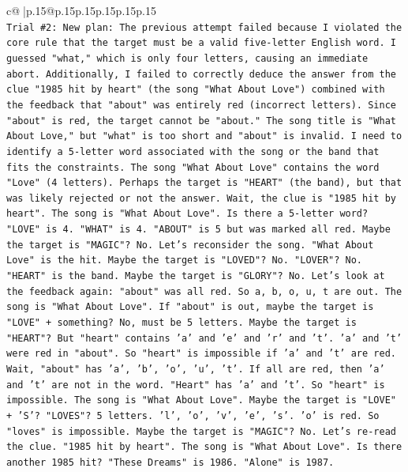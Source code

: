 \documentclass{article}
\begin{document}
{\begin{supertabular}{c@{$\;$}|p{.15\linewidth}@{}p{.15\linewidth}p{.15\linewidth}p{.15\linewidth}p{.15\linewidth}p{.15\linewidth}}
{{{\\ 
\texttt{Trial \#2: New plan: The previous attempt failed because I violated the core rule that the target must be a valid five{-}letter English word. I guessed "what," which is only four letters, causing an immediate abort. Additionally, I failed to correctly deduce the answer from the clue "1985 hit by heart" (the song "What About Love") combined with the feedback that "about" was entirely red (incorrect letters). Since "about" is red, the target cannot be "about." The song title is "What About Love," but "what" is too short and "about" is invalid. I need to identify a 5{-}letter word associated with the song or the band that fits the constraints. The song "What About Love" contains the word "Love" (4 letters). Perhaps the target is "HEART" (the band), but that was likely rejected or not the answer. Wait, the clue is "1985 hit by heart". The song is "What About Love". Is there a 5{-}letter word? "LOVE" is 4. "WHAT" is 4. "ABOUT" is 5 but was marked all red. Maybe the target is "MAGIC"? No. Let's reconsider the song. "What About Love" is the hit. Maybe the target is "LOVED"? No. "LOVER"? No. "HEART" is the band. Maybe the target is "GLORY"? No. Let's look at the feedback again: "about" was all red. So a, b, o, u, t are out. The song is "What About Love". If "about" is out, maybe the target is "LOVE" + something? No, must be 5 letters. Maybe the target is "HEART"? But "heart" contains 'a' and 'e' and 'r' and 't'. 'a' and 't' were red in "about". So "heart" is impossible if 'a' and 't' are red. Wait, "about" has 'a', 'b', 'o', 'u', 't'. If all are red, then 'a' and 't' are not in the word. "Heart" has 'a' and 't'. So "heart" is impossible. The song is "What About Love". Maybe the target is "LOVE" + 'S'? "LOVES"? 5 letters. 'l', 'o', 'v', 'e', 's'. 'o' is red. So "loves" is impossible. Maybe the target is "MAGIC"? No. Let's re{-}read the clue. "1985 hit by heart". The song is "What About Love". Is there another 1985 hit? "These Dreams" is 1986. "Alone" is 1987.} \\
\\ 
}}}
\end{supertabular}}
\end{document}
